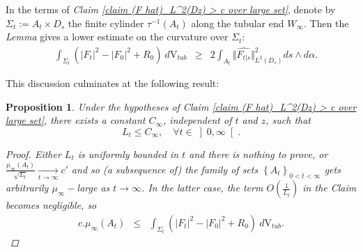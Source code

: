 \documentclass{article}
\newcommand{\dvtub}{\:d\text{V}_{tub}}
\newtheorem{proposition}[theorem]{Proposition}
\begin{document}
In the terms of \emph{Claim \ref{claim (F hat)_L^2(Dz) > c  over large set}}, denote by $\Sigma_t := A_t \times D_s$ the finite cylinder $\tau^{-1}\left( A_t \right)$ along the tubular end $W_\infty$. Then the \emph{Lemma}  gives a lower  estimate on the curvature over $\Sigma_t$:
\begin{eqnarray}       \label{eq energy over finite cylinders}
        \quad\int_{\Sigma_t} \left(\left\vert F_t\right\vert^2
        - \left\vert F_0 \right\vert^2 +R_0\right) 
        \dvtub         &\geq&2 \int_{A_t} \Vert \widehat{F_{t \vert s}} \Vert^2_{L^2(D_s)}
        ds\wedge d\alpha.
\end{eqnarray} 

This discussion culminates at the following result:
\begin{proposition}     \label{Prop Uniform upper bound}
Under the hypotheses of  \emph{Claim \ref{claim (F hat)_L^2(Dz) > c  over large set}}, there exists a constant $C_\infty$, independent of $t$ and $z$, such that
\begin{displaymath}
L_t \leq C_\infty , \quad \forall t\in \left]0,\infty \right[.
\end{displaymath}

\begin{proof}

Either $L_t$ is uniformly bounded in $t$ and there is nothing to prove, or  $\displaystyle\frac{\mu_{\infty}\left( A_t \right)}{\sqrt{L_{t}}}\underset{t\to\infty}{\longrightarrow} c'$ and so (a subsequence of) the family of sets $\left\{A_t\right\}_{0<t<\infty}$ gets arbitrarily $\mu_\infty-$large as $t\rightarrow \infty$.
In the latter case, the term $O\left( \frac{1}{L_t} \right)$ in the \emph{Claim} becomes negligible, so
\begin{eqnarray*}
        c.\mu_{\infty}\left( A_t \right) 
        &\leq& \int_{\Sigma_t} \left(\left\vert F_t\right\vert^2
        - \left\vert F_0 \right\vert^2 +R_0\right) 
        \dvtub.
\end{eqnarray*}


\end{proof}
\end{proposition}
\end{document}
